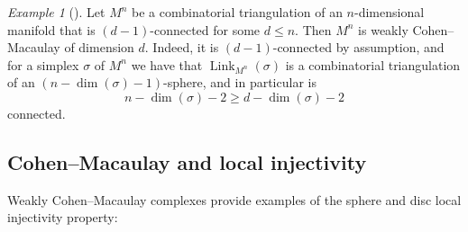 \documentclass[11pt]{amsart}
\numberwithin{equation}{section}
\theoremstyle{plain}
\theoremstyle{definition}
\theoremstyle{remark}
\newtheorem{eg}[theorem]{Example}
\newenvironment{example}[1][]{\begin{eg}[#1] \pushQED{\qed}}{\popQED \end{eg}}
\DeclareMathOperator{\Link}{Link}
\begin{document}
\begin{example}
\label{example:manifoldcm}
Let $M^n$ be a combinatorial triangulation of an $n$-dimensional manifold that is $(d-1)$-connected for some
$d \leq n$.  Then $M^n$ is weakly Cohen--Macaulay of dimension $d$.  Indeed, it is $(d-1)$-connected
by assumption, and for a simplex $\sigma$ of $M^n$ we have that $\Link_{M^n}(\sigma)$ is a
combinatorial triangulation of an $(n-\dim(\sigma)-1)$-sphere, and in particular is
\[n-\dim(\sigma)-2 \geq d-\dim(\sigma) -2\]
connected.
\end{example}

\subsection{Cohen--Macaulay and local injectivity}
Weakly Cohen--Macaulay complexes provide examples of the sphere and disc local injectivity property:
\end{document}
